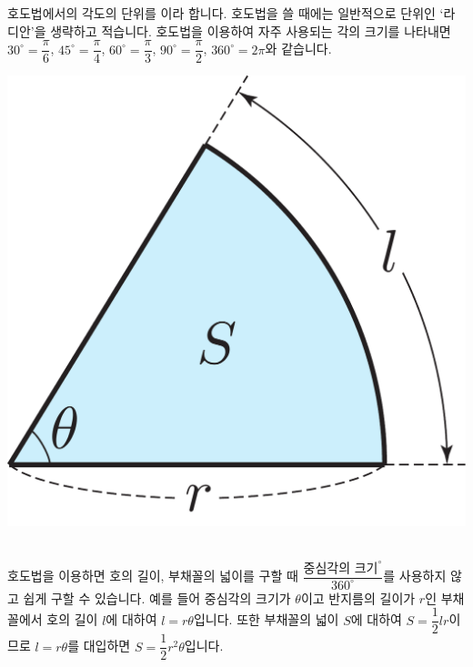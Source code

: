 호도법에서의 각도의 단위를 이라 합니다. 호도법을 쓸 때에는 일반적으로 단위인 `라디안'을 생략하고 적습니다. 호도법을 이용하여 자주 사용되는 각의 크기를 나타내면 $30^\circ = \dfrac{\pi}{6}$, $45^\circ=\dfrac{\pi}{4}$, $60^\circ = \dfrac{\pi}{3}$, $90^\circ=\dfrac{\pi}{2}$, $360^\circ=2\pi$와 같습니다. 
\begin{center} \includegraphics[scale=\pgfkeysvalueof{picsize}]{DBs/pic/zert_07.pdf}\
	\end{center}호도법을 이용하면 호의 길이, 부채꼴의 넓이를 구할 때 $\dfrac{\text{중심각의 크기}^\circ}{360^\circ}$를 사용하지 않고 쉽게 구할 수 있습니다. 예를 들어 중심각의 크기가 $\theta$이고 반지름의 길이가 $r$인 부채꼴에서 호의 길이 $l$에 대하여 $l = r\theta$입니다. 또한 부채꼴의 넓이 $S$에 대하여 $S = \dfrac{1}{2}lr$이므로 $l = r\theta$를 대입하면 $S =\dfrac{1}{2}r^2\theta$입니다.\\[-2em]

